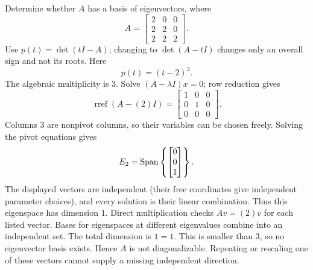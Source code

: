 \goal Determine whether $A$ has a basis of eigenvectors, where
\[A=\begin{bmatrix}2&0&0\\2&2&0\\2&2&2\end{bmatrix}.\]
Use $p(t)=\det(tI-A)$; changing to $\det(A-tI)$ changes only an overall sign and not its roots. Here
\[p(t)=\left(t - 2\right)^{3}.\]
The algebraic multiplicity is $3$. Solve $(A-\lambda I)x=0$; row reduction gives
\[\operatorname{rref}(A-(2)I)=\begin{bmatrix}1&0&0\\0&1&0\\0&0&0\end{bmatrix}.\]
Columns 3 are nonpivot columns, so their variables can be chosen freely. Solving the pivot equations gives
\[E_{2}=\operatorname{Span}\left\{\begin{bmatrix}0\\0\\1\end{bmatrix}\right\}.\]
The displayed vectors are independent (their free coordinates give independent parameter choices), and every solution is their linear combination. Thus this eigenspace has dimension $1$. Direct multiplication checks $Av=(2)v$ for each listed vector.
Bases for eigenspaces at different eigenvalues combine into an independent set. The total dimension is $1=1$.
This is smaller than $3$, so no eigenvector basis exists. Hence $A$ is not diagonalizable. Repeating or rescaling one of these vectors cannot supply a missing independent direction.


